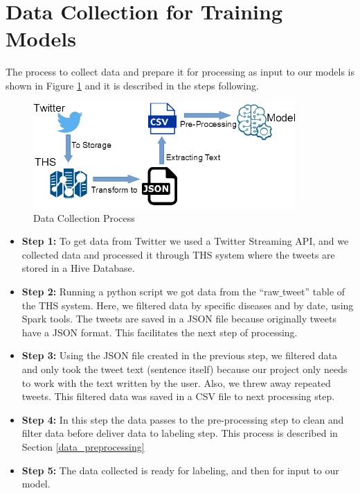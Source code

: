 \documentclass[12pt]{report}
\begin{document}
\section{Data Collection for Training Models}

The process to collect data and prepare it for processing as  input to our models is shown in Figure \ref{figure:data_collection} and it is described in the steps following.

\begin{figure}[H]	
	\centering
	\includegraphics[width=100mm, scale = 1]{images/8_data_collection.png}	
	\caption{Data Collection Process }	
	\label{figure:data_collection}
\end{figure}

\begin{itemize}[nolistsep]
	
	\item \textbf{Step 1:} To get data from Twitter we used a Twitter Streaming \ac{API}, and we collected data and  processed it through \ac{THS} system where the tweets are stored in a Hive Database.
	
	\item \textbf{Step 2:} Running a python script we got data from  the ``raw$\_$tweet'' table of the \ac{THS} system. Here, we filtered data by specific diseases and by date, 
	using Spark tools. The tweets are saved  in a \ac{JSON} file because originally tweets have a \ac{JSON} format. This facilitates the next step of processing.
	
	\item \textbf{Step 3:} Using the  \ac{JSON}  file created in the previous step, we filtered data and only took the tweet text (sentence itself) because our project only needs to work with the text written by the user. Also, we threw away repeated tweets. This filtered data was saved in a \ac{CSV} file to next processing step.
	
	\item \textbf{Step 4:} In this step the data passes to the pre-processing step to clean and filter data before deliver data to labeling step. This process is described in Section \ref{data_preprocessing} 
	
	\item \textbf{Step 5:} The data collected is ready for labeling, and then for input to our model.
	
\end{itemize}
\end{document}
